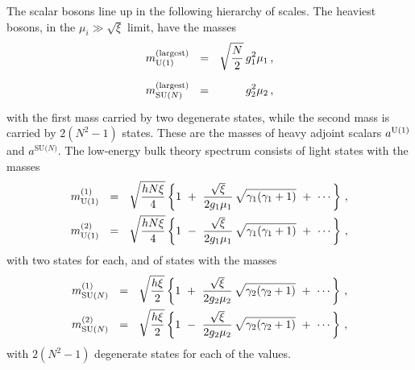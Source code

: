 \documentclass[12pt]{article}
\newcommand{\aU}{a^{\rm U(1)}}
\newcommand{\aN}{a^\text{SU($N$)}}
\begin{document}
	The scalar bosons line up in the following hierarchy of scales.
	The heaviest bosons, in the $ \mu_i \gg \sqrt{\xi} $ limit, have the masses
\begin{align}
\label{amass}
%
\notag
	m_{\rm U(1)}^{\rm(largest)} & ~~=~~ \sqrt{\frac{N}{2}}\, g_1^2\mu_1 \,, \\
%
	m_\text{SU($N$)}^{\rm(largest)} & ~~=~~ \phantom{\sqrt{\frac{N}{2}}\, }
						g_2^2\mu_2\,,
\end{align}
	with the first mass carried by two degenerate states, while
	the second mass is carried by $ 2 (N^2 - 1) $ states.
	These are the masses of heavy adjoint scalars $ \aU $ and $ \aN $.
The low-energy bulk theory spectrum consists of light states with the masses
\begin{align}
\label{U1mass}
%
\notag
	m_\text{U(1)}^{(1)}  ~~=~~ \sqrt{\frac{h N\xi}{4}}
		\left\{  1 ~+~ \frac{\sqrt{\xi}}{2g_1\mu_1}\,\sqrt{\gamma_1 (\gamma_1 + 1)} 
				~+~ \cdots \right\}\,,	
	\\
%
	m_\text{U(1)}^{(2)}  ~~=~~ \sqrt{\frac{h N\xi}{4}}
		\left\{  1 ~-~ \frac{\sqrt{\xi}}{2g_1\mu_1}\,\sqrt{\gamma_1 (\gamma_1 + 1)}
				~+~ \cdots \right\}\,,
\end{align}
	with two states for each, and of states with the masses
\begin{align}
\label{SUNmass}
%
\notag
	m_\text{SU($N$)}^{(1)} ~~=~~ \sqrt{\frac{h\xi}{2}}
		\left\{ 1 ~+~ \frac{\sqrt{\xi}}{2 g_2\mu_2}\,\sqrt{\gamma_2 (\gamma_2 + 1)}
				~+~ \cdots \right\}\,,
	\\
%
	m_\text{SU($N$)}^{(2)} ~~=~~ \sqrt{\frac{h\xi}{2}}
		\left\{ 1 ~-~ \frac{\sqrt{\xi}}{2 g_2\mu_2}\,\sqrt{\gamma_2 (\gamma_2 + 1)}
				~+~ \cdots \right\}\,,
\end{align}
	with $ 2 (N^2 - 1) $ degenerate states for each of the values.
\end{document}
